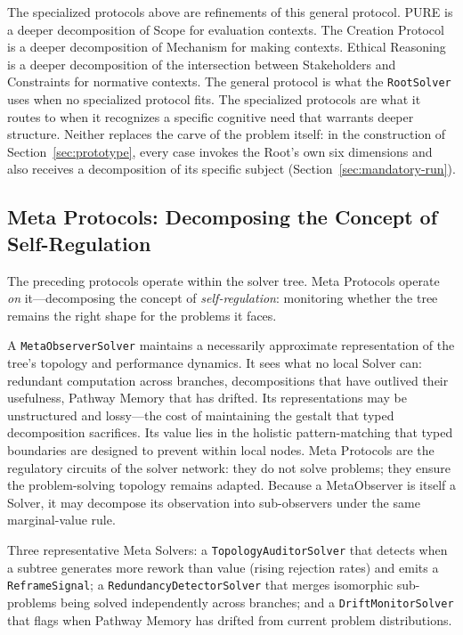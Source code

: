 \documentclass[11pt]{article}
\let\oldtexttt\texttt
\renewcommand{\texttt}[1]{\oldtexttt{\small #1}}
\begin{document}
The specialized protocols above are refinements of this general protocol. PURE is a deeper decomposition of Scope for evaluation contexts. The Creation Protocol is a deeper decomposition of Mechanism for making contexts. Ethical Reasoning is a deeper decomposition of the intersection between Stakeholders and Constraints for normative contexts. The general protocol is what the \texttt{RootSolver} uses when no specialized protocol fits. The specialized protocols are what it routes to when it recognizes a specific cognitive need that warrants deeper structure. Neither replaces the carve of the problem itself: in the construction of Section~\ref{sec:prototype}, every case invokes the Root's own six dimensions and also receives a decomposition of its specific subject (Section~\ref{sec:mandatory-run}).

\subsection{Meta Protocols: Decomposing the Concept of Self-Regulation}
\label{sec:meta-protocols}

The preceding protocols operate within the solver tree. Meta Protocols operate \emph{on} it---decomposing the concept of \emph{self-regulation}: monitoring whether the tree remains the right shape for the problems it faces.

A \texttt{MetaObserverSolver} maintains a necessarily approximate representation of the tree's topology and performance dynamics. It sees what no local Solver can: redundant computation across branches, decompositions that have outlived their usefulness, Pathway Memory that has drifted. Its representations may be unstructured and lossy---the cost of maintaining the gestalt that typed decomposition sacrifices. Its value lies in the holistic pattern-matching that typed boundaries are designed to prevent within local nodes. Meta Protocols are the regulatory circuits of the solver network: they do not solve problems; they ensure the problem-solving topology remains adapted. Because a MetaObserver is itself a Solver, it may decompose its observation into sub-observers under the same marginal-value rule.

Three representative Meta Solvers: a \texttt{TopologyAuditorSolver} that detects when a subtree generates more rework than value (rising rejection rates) and emits a \texttt{ReframeSignal}; a \texttt{RedundancyDetectorSolver} that merges isomorphic sub-problems being solved independently across branches; and a \texttt{DriftMonitorSolver} that flags when Pathway Memory has drifted from current problem distributions.
\end{document}
